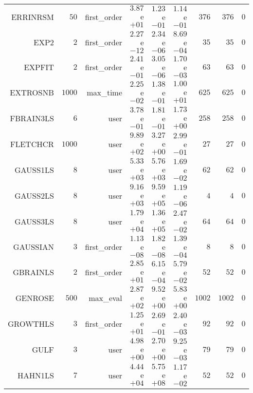 \begin{longtable}{rrrrrrrrr}
ERRINRSM & \(    50\) & first\_order & \( 3.87\)e\(+01\) & \( 1.23\)e\(-01\) & \( 1.14\)e\(-01\) & \(   376\) & \(   376\) & \(     0\) \\
EXP2 & \(     2\) & first\_order & \( 2.27\)e\(-12\) & \( 2.34\)e\(-06\) & \( 8.69\)e\(-04\) & \(    35\) & \(    35\) & \(     0\) \\
EXPFIT & \(     2\) & first\_order & \( 2.41\)e\(-01\) & \( 3.05\)e\(-06\) & \( 1.70\)e\(-03\) & \(    63\) & \(    63\) & \(     0\) \\
EXTROSNB & \(  1000\) & max\_time & \( 2.25\)e\(-02\) & \( 1.38\)e\(-01\) & \( 1.00\)e\(+01\) & \(   625\) & \(   625\) & \(     0\) \\
FBRAIN3LS & \(     6\) & user & \( 3.78\)e\(-01\) & \( 1.81\)e\(-01\) & \( 1.73\)e\(+00\) & \(   258\) & \(   258\) & \(     0\) \\
FLETCHCR & \(  1000\) & user & \( 9.89\)e\(+02\) & \( 3.27\)e\(+00\) & \( 2.99\)e\(-01\) & \(    27\) & \(    27\) & \(     0\) \\
GAUSS1LS & \(     8\) & user & \( 5.33\)e\(+03\) & \( 5.76\)e\(+03\) & \( 1.69\)e\(-02\) & \(    62\) & \(    62\) & \(     0\) \\
GAUSS2LS & \(     8\) & user & \( 9.16\)e\(+03\) & \( 9.59\)e\(+05\) & \( 1.19\)e\(-06\) & \(     4\) & \(     4\) & \(     0\) \\
GAUSS3LS & \(     8\) & user & \( 1.79\)e\(+04\) & \( 1.36\)e\(+05\) & \( 2.47\)e\(-02\) & \(    64\) & \(    64\) & \(     0\) \\
GAUSSIAN & \(     3\) & first\_order & \( 1.13\)e\(-08\) & \( 1.82\)e\(-08\) & \( 1.39\)e\(-04\) & \(     8\) & \(     8\) & \(     0\) \\
GBRAINLS & \(     2\) & first\_order & \( 2.85\)e\(+01\) & \( 6.15\)e\(-04\) & \( 5.79\)e\(-02\) & \(    52\) & \(    52\) & \(     0\) \\
GENROSE & \(   500\) & max\_eval & \( 2.87\)e\(+02\) & \( 9.52\)e\(+00\) & \( 5.83\)e\(+00\) & \(  1002\) & \(  1002\) & \(     0\) \\
GROWTHLS & \(     3\) & first\_order & \( 1.25\)e\(+01\) & \( 2.69\)e\(-01\) & \( 2.40\)e\(-03\) & \(    92\) & \(    92\) & \(     0\) \\
GULF & \(     3\) & user & \( 4.98\)e\(+00\) & \( 2.70\)e\(+00\) & \( 9.25\)e\(-03\) & \(    79\) & \(    79\) & \(     0\) \\
HAHN1LS & \(     7\) & user & \( 4.44\)e\(+04\) & \( 5.75\)e\(+08\) & \( 1.17\)e\(-02\) & \(    52\) & \(    52\) & \(     0\) \\

\end{longtable}
